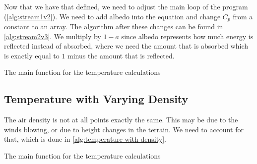 Now that we have that defined, we need to adjust the main loop of the program (\autoref{alg:stream1v2}). We need to add albedo into the
equation and change $C_p$ from a constant to an array. The algorithm after these changes can be found in \autoref{alg:stream2v3}. We multiply by $1 - a$ since albedo represents how much energy is 
reflected instead of absorbed, where we need the amount that is absorbed which is exactly equal to $1$ minus the amount that is reflected.

\begin{algorithm}[hbt]
    \caption{The main function for the temperature calculations}
    \label{alg:stream2v3}
    \SetAlgoLined
\end{algorithm}

\subsection{Temperature with Varying Density}
The air density is not at all points exactly the same. This may be due to the winds blowing, or due to height changes in the terrain. We need to account for that, which is done in 
\autoref{alg:temperature with density}.

\begin{algorithm}[hbt]
    \caption{The main function for the temperature calculations}
    \label{alg:temperature with density}
    \SetAlgoLined
\end{algorithm}

